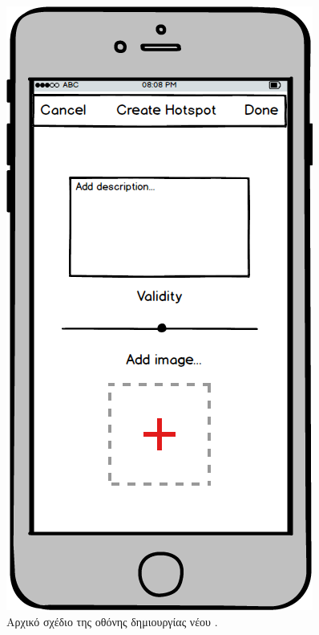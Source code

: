 \subsubsection{}

\begin{figure}[h]
    \centering
    \includegraphics[scale=0.25]{figures/create-hotspot.png}
    \caption{Αρχικό σχέδιο της οθόνης δημιουργίας νέου .}
    \label{createmockup}
\end{figure}

